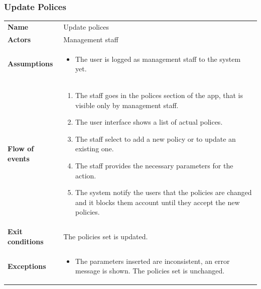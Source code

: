 \documentclass[english]{article}
\begin{document}
		\subsubsection{Update Polices}
		\begin{center}
		\begin{tabular}{l||p{10cm}}
		\textbf{Name} 
			& Update polices\\ [8px]
		\textbf{Actors} 
			& Management staff\\ [8px]
		\textbf{Assumptions} 
			& \begin{itemize}
				\item The user is logged as management staff to the system yet.
			\end{itemize}\\
		\textbf{Flow of events}
			& \begin{enumerate}
	 			\item The staff goes in the polices section of the app, that is visible only by management staff.
				\item The user interface shows a list of actual polices.
				\item The staff select to add a new policy or to update an existing one.
				\item The staff provides the necessary parameters for the action.
				\item The system notify the users that the policies are changed and it blocks them account until they accept the new policies.
			\end{enumerate}\\ 
		\textbf{Exit conditions}
			& The policies set is updated.\\ [8px]
		\textbf{Exceptions}
			& \begin{itemize}
				\item The parameters inserted are inconsistent, an error message is shown. The policies set is unchanged.
			\end{itemize}
		\end{tabular}
		\end{center}
		\noindent
\end{document}
